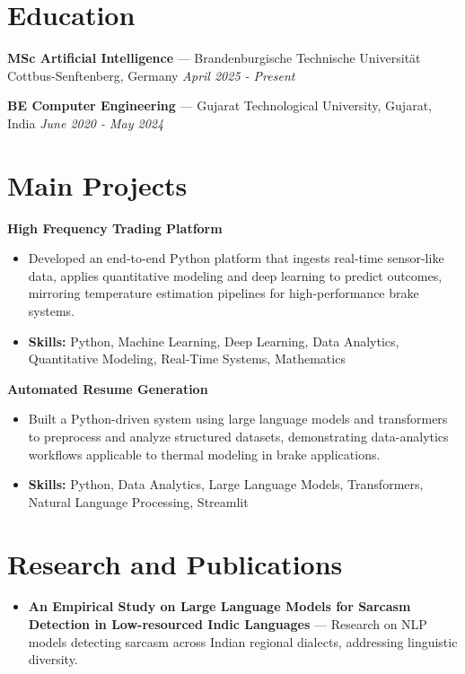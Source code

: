 \documentclass[a4paper,10pt]{article}
\begin{document}
\section*{Education}
\textbf{MSc Artificial Intelligence} — Brandenburgische Technische Universität Cottbus-Senftenberg, Germany \hfill \textit{April 2025 - Present}\par
\vspace{1.5pt}
\textbf{BE Computer Engineering} — Gujarat Technological University, Gujarat, India \hfill \textit{June 2020 - May 2024}\par

\section*{Main Projects}
\textbf{High Frequency Trading Platform}\par
\vspace{1pt}
\begin{itemize}
  \item Developed an end-to-end Python platform that ingests real-time sensor-like data, applies quantitative modeling and deep learning to predict outcomes, mirroring temperature estimation pipelines for high-performance brake systems.
  \item \textbf{Skills:} Python, Machine Learning, Deep Learning, Data Analytics, Quantitative Modeling, Real-Time Systems, Mathematics
\end{itemize}
\vspace{3pt}
\textbf{Automated Resume Generation}\par
\vspace{1pt}
\begin{itemize}
  \item Built a Python-driven system using large language models and transformers to preprocess and analyze structured datasets, demonstrating data-analytics workflows applicable to thermal modeling in brake applications.
  \item \textbf{Skills:} Python, Data Analytics, Large Language Models, Transformers, Natural Language Processing, Streamlit
\end{itemize}

\section*{Research and Publications}
\begin{itemize}
\item \textbf{An Empirical Study on Large Language Models for Sarcasm Detection in Low-resourced Indic Languages} — Research on NLP models detecting sarcasm across Indian regional dialects, addressing linguistic diversity.
\end{itemize}
\end{document}

